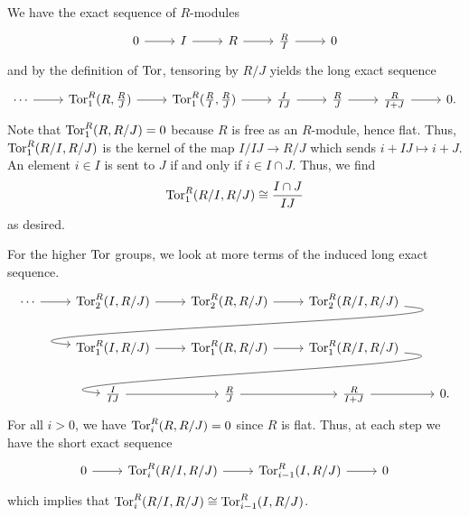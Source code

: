 \documentclass[../../master.tex]{subfiles}
\begin{document}
\begin{solution}
    We have the exact sequence of $R$-modules
    \[
    \begin{tikzcd}
        0 & I & R & \frac{R}{I} & 0
        \arrow[from=1-1, to=1-2]
        \arrow[from=1-2, to=1-3]
        \arrow[from=1-3, to=1-4]
        \arrow[from=1-4, to=1-5] 
    \end{tikzcd}
    \]
    and by the definition of $\operatorname{Tor}$, tensoring by $R/J$ yields the long exact sequence
    \[
    \begin{tikzcd}
        \cdots & \Tor_1^{R}(R, \frac{R}{J}) & \Tor_1^{R}(\frac{R}{I}, \frac{R}{J}) & \frac{I}{IJ} & \frac{R}{J} & \frac{R}{I + J} & 0.
        \arrow[from=1-1, to=1-2]
        \arrow[from=1-2, to=1-3]
        \arrow[from=1-3, to=1-4]
        \arrow[from=1-4, to=1-5] 
        \arrow[from=1-5, to=1-6] 
        \arrow[from=1-6, to=1-7] 
    \end{tikzcd}
    \]
    Note that $\operatorname{Tor}_1^{R}(R, R/J) = 0$ because $R$ is free as an $R$-module, hence flat.
    Thus, $\operatorname{Tor}_1^{R}(R/I, R/J)$ is the kernel of the map $I/IJ \to R/J$ which sends $i + IJ \mapsto i + J$.
    An element $i \in I$ is sent to $J$ if and only if $i \in I \cap J$.
    Thus, we find
    \[
        \operatorname{Tor}_1^{R}(R/I, R/J) \cong \frac{I \cap J}{IJ}
    \]
    as desired.

    For the higher $\operatorname{Tor}$ groups, we look at more terms of the induced long exact sequence.
    \[
        \begin{tikzcd}
        \cdots & \Tor_2^{R}(I, R/J) & \Tor_2^{R}(R, R/J) & \Tor_2^{R}(R/I, R/J) \\
               & \Tor_1^{R}(I, R/J) & \Tor_1^{R}(R, R/J) & \Tor_1^{R}(R/I, R/J) \\
               & \frac{I}{IJ} & \frac{R}{J} & \frac{R}{I+J} & 0.
               \arrow[from=1-1, to=1-2]
               \arrow[from=1-2, to=1-3]
               \arrow[from=1-3, to=1-4] 
               \arrow[from=1-4, to=2-2, out=355, in=175, overlay] 
               \arrow[from=2-2, to=2-3] 
               \arrow[from=2-3, to=2-4] 
               \arrow[from=2-4, to=3-2, out=355, in=175, overlay] 
               \arrow[from=3-2, to=3-3]
               \arrow[from=3-3, to=3-4]
               \arrow[from=3-4, to=3-5] 
    \end{tikzcd}
    \]
    For all $i > 0$, we have $\operatorname{Tor}_i^{R}(R, R/J) = 0$ since $R$ is flat.
    Thus, at each step we have the short exact sequence
    \[
    \begin{tikzcd}
        0 & \Tor_i^{R}(R/I, R/J) & \Tor_{i-1}^{R}(I, R/J) & 0
        \arrow[from=1-1, to=1-2]
        \arrow[from=1-2, to=1-3]
        \arrow[from=1-3, to=1-4] 
    \end{tikzcd}
    \]
    which implies that $\operatorname{Tor}_i^{R}(R/I, R/J) \cong \operatorname{Tor}_{i-1}^{R}(I, R/J)$.
\end{solution}
\end{document}
